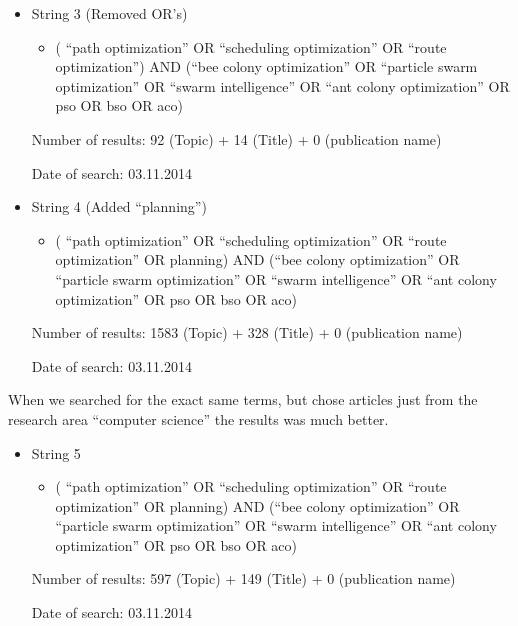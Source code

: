 \begin{itemize}
\item String 3 (Removed OR's)
\begin{itemize}
\item ( ``path optimization'' OR ``scheduling optimization'' OR ``route optimization'') AND (``bee colony optimization'' OR ``particle swarm optimization'' OR ``swarm intelligence'' OR ``ant colony optimization'' OR pso OR bso OR aco) 
\end{itemize}
\par
Number of results: 92 (Topic) + 14 (Title) + 0 (publication name)
\par
Date of search: 03.11.2014
\end{itemize}
\begin{itemize}
\item String 4 (Added ``planning'')
\begin{itemize}
\item ( ``path optimization'' OR ``scheduling optimization'' OR ``route optimization'' OR planning) AND (``bee colony optimization'' OR ``particle swarm optimization'' OR ``swarm intelligence'' OR ``ant colony optimization'' OR pso OR bso OR aco) 
\end{itemize}
\par
Number of results: 1583 (Topic) + 328 (Title) + 0 (publication name)
\par
Date of search: 03.11.2014
\end{itemize}
When we searched for the exact same terms, but chose articles just from the research area “computer science” the results was much better.
\begin{itemize}
\item String 5 
\begin{itemize}
\item ( ``path optimization'' OR ``scheduling optimization'' OR ``route optimization'' OR planning) AND (``bee colony optimization'' OR ``particle swarm optimization'' OR ``swarm intelligence'' OR ``ant colony optimization'' OR pso OR bso OR aco) 
\end{itemize}
\par
Number of results: 597 (Topic) + 149 (Title) + 0 (publication name)
\par
Date of search: 03.11.2014
\end{itemize}
